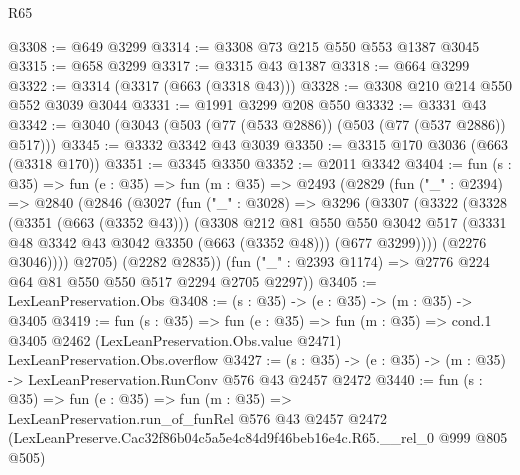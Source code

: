 \begin{lexlean}{R65}
\begin{coremodule}
@3308 := @649 @3299
@3314 := @3308 @73 @215 @550 @553 @1387 @3045
@3315 := @658 @3299
@3317 := @3315 @43 @1387
@3318 := @664 @3299
@3322 := @3314 (@3317 (@663 (@3318 @43)))
@3328 := @3308 @210 @214 @550 @552 @3039 @3044
@3331 := @1991 @3299 @208 @550
@3332 := @3331 @43
@3342 := @3040 (@3043 (@503 (@77 (@533 @2886)) (@503 (@77 (@537 @2886)) @517)))
@3345 := @3332 @3342 @43 @3039
@3350 := @3315 @170 @3036 (@663 (@3318 @170))
@3351 := @3345 @3350
@3352 := @2011 @3342
@3404 := fun (s : @35) =>
  fun (e : @35) =>
  fun (m : @35) =>
  @2493
    (@2829
      (fun ("_" : @2394) =>
      @2840
        (@2846
          (@3027
            (fun ("_" : @3028) =>
            @3296
              (@3307
                (@3322
                  (@3328
                    (@3351 (@663 (@3352 @43)))
                    (@3308
                      @212
                      @81
                      @550
                      @550
                      @3042
                      @517
                      (@3331 @48 @3342 @43 @3042 @3350 (@663 (@3352 @48)))
                      (@677 @3299))))
                (@2276 @3046))))
          @2705)
        (@2282 @2835))
      (fun ("_" : @2393 @1174) => @2776 @224 @64 @81 @550 @550 @517 @2294 @2705 @2297))
@3405 := LexLeanPreservation.Obs
@3408 := (s : @35) -> (e : @35) -> (m : @35) -> @3405
@3419 := fun (s : @35) =>
  fun (e : @35) =>
  fun (m : @35) =>
  cond.{1} @3405 @2462 (LexLeanPreservation.Obs.value @2471) LexLeanPreservation.Obs.overflow
@3427 := (s : @35) -> (e : @35) -> (m : @35) -> LexLeanPreservation.RunConv @576 @43 @2457 @2472
@3440 := fun (s : @35) =>
  fun (e : @35) =>
  fun (m : @35) =>
  LexLeanPreservation.run_of_funRel
    @576
    @43
    @2457
    @2472
    (LexLeanPreserve.Cac32f86b04c5a5e4c84d9f46beb16e4c.R65.__rel_0 @999 @805 @505)
\end{coremodule}
\end{lexlean}
